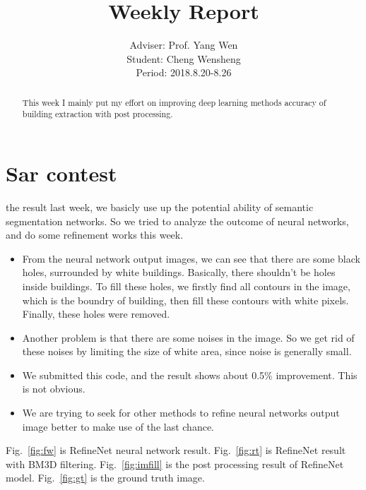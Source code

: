 \documentclass[]{IEEEtran}
\begin{document}
	\title{Weekly Report}
	\author{Adviser: Prof. Yang Wen \\Student: Cheng Wensheng\\ Period: 2018.8.20-8.26
	}
	\maketitle

\begin{abstract}
	This week I mainly put my effort on improving deep learning methods accuracy of building extraction with post processing.
\end{abstract}

\section{Sar contest}
	 the result last week, we basicly use up the potential ability of semantic segmentation networks. So we tried to analyze the outcome of neural networks, and do some refinement works this week.	
	\begin{itemize}
		\item From the neural network output images, we can see that there are some black holes, surrounded by white buildings. Basically, there shouldn't be holes inside buildings. To fill these holes, we firstly find all contours in the image, which is the boundry of building, then fill these contours with white pixels. Finally, these holes were removed.
		\item Another problem is that there are some noises in the image. So we get rid of these noises by limiting the size of white area, since noise is generally small.
		\item We submitted this code, and the result shows about 0.5$\%$ improvement. This is not obvious.
		\item We are trying to seek for other methods to refine neural networks output image better to make use of the last chance.
	\end{itemize}
	
	Fig.~\ref{fig:fw} is RefineNet neural network result. Fig.~\ref{fig:rt} is RefineNet result with BM3D filtering. Fig.~\ref{fig:imfill} is the post processing result of RefineNet model. Fig.~\ref{fig:gt} is the ground truth image.
	
\end{document}
